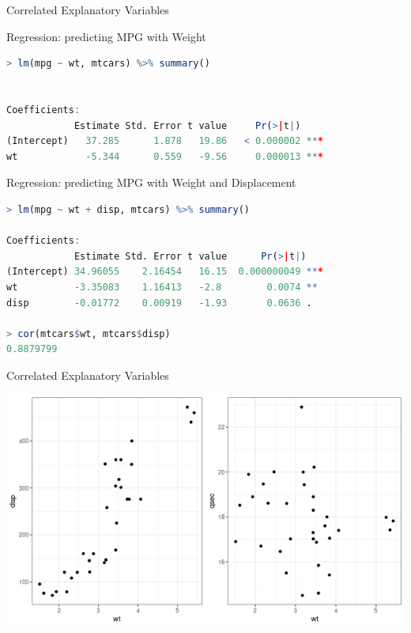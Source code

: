 \documentclass{beamer}
\begin{document}
\begin{frame}[fragile]{Correlated Explanatory Variables}
\footnotesize

Regression: predicting MPG with Weight
\begin{lstlisting}[language=R]
> lm(mpg ~ wt, mtcars) %>% summary()


Coefficients:
            Estimate Std. Error t value     Pr(>|t|)    
(Intercept)   37.285      1.878   19.86   < 0.000002 ***
wt            -5.344      0.559   -9.56     0.000013 ***
\end{lstlisting} \vspace{2mm}

Regression: predicting MPG with Weight and Displacement
\begin{lstlisting}[language=R]
> lm(mpg ~ wt + disp, mtcars) %>% summary()

Coefficients:
            Estimate Std. Error t value      Pr(>|t|)    
(Intercept) 34.96055    2.16454   16.15  0.000000049 ***
wt          -3.35083    1.16413   -2.8        0.0074 ** 
disp        -0.01772    0.00919   -1.93       0.0636 .

> cor(mtcars$wt, mtcars$disp)
0.8879799
\end{lstlisting}

\end{frame}

\begin{frame}{Correlated Explanatory Variables}
\begin{center}
\includegraphics[scale=0.5]{cor_compare.png}
\end{center}
\end{frame}
\end{document}
